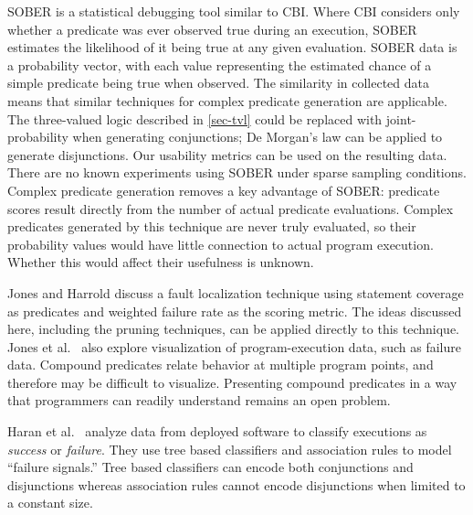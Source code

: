 SOBER \cite{1081753} is a statistical debugging tool similar to CBI\@.  Where CBI considers only whether a predicate was ever observed true during an execution, SOBER estimates the likelihood of it being true at any given evaluation.  SOBER data is a probability vector, with each value representing the estimated chance of a simple predicate being true when observed.  The similarity in collected data means that similar techniques for complex predicate generation are applicable.  The three-valued logic described in \autoref{sec-tvl} could be replaced with joint-probability when generating conjunctions; De Morgan's law can be applied to generate disjunctions.  Our usability metrics can be used on the resulting data.  There are no known experiments using SOBER under sparse sampling conditions.  Complex predicate generation removes a key advantage of SOBER: predicate scores result directly from the number of actual predicate evaluations.  Complex predicates generated by this technique are never truly evaluated, so their probability values would have little connection to actual program execution.  Whether this would affect their usefulness is unknown.

Jones and Harrold \cite{1101949} discuss a fault localization technique using statement coverage as predicates and weighted failure rate as the scoring metric.  The ideas discussed here, including the pruning techniques, can be applied directly to this technique.  Jones et al.\ \cite{DBLP:journals/ivs/JonesOH04} also explore visualization of program-execution data, such as failure data.  Compound predicates relate behavior at multiple program points, and therefore may be difficult to visualize.  Presenting compound predicates in a way that programmers can readily understand remains an open problem.

Haran et al.\ \cite{haran05TCEDS} analyze data from deployed software to classify executions as \emph{success} or \emph{failure}.  They use tree based classifiers and association rules to model ``failure signals.''  Tree based classifiers can encode both conjunctions and disjunctions whereas association rules cannot encode disjunctions when limited to a constant size.



